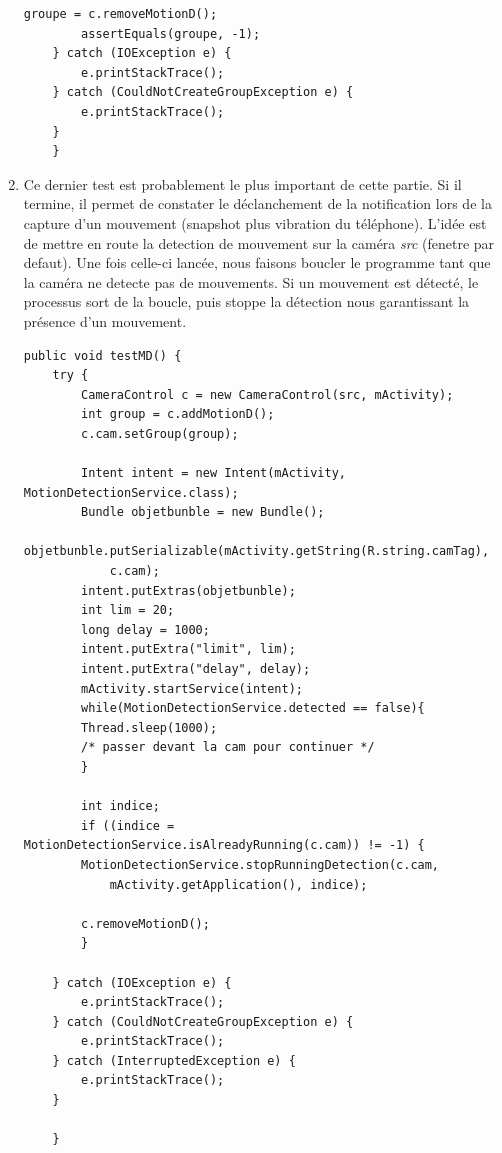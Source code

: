 \begin{enumerate}
\begin{lstlisting}[format=JAVA,caption={Test 6 : Ajout et suppression d'une fenetre}]
	    groupe = c.removeMotionD();
	    assertEquals(groupe, -1);
	} catch (IOException e) {
	    e.printStackTrace();
	} catch (CouldNotCreateGroupException e) {
	    e.printStackTrace();
	}
    }
\end{lstlisting}
\item Ce dernier test est probablement le plus important de cette partie. Si il termine, il permet de constater le déclanchement de la notification lors de la capture d'un mouvement (snapshot plus vibration du téléphone). L'idée est de mettre en route la detection de mouvement sur la caméra \textit{src} (fenetre par defaut). Une fois celle-ci lancée, nous faisons boucler le programme tant que la caméra ne detecte pas de mouvements. Si un mouvement est détecté, le processus sort de la boucle, puis stoppe la détection nous garantissant la présence d'un mouvement.

\begin{lstlisting}[format=JAVA,caption={Test 7 :Détection des mouvements}]
    public void testMD() {
	try {
	    CameraControl c = new CameraControl(src, mActivity);
	    int group = c.addMotionD();
	    c.cam.setGroup(group);
	    
	    Intent intent = new Intent(mActivity, MotionDetectionService.class);
	    Bundle objetbunble = new Bundle();
	    objetbunble.putSerializable(mActivity.getString(R.string.camTag),
		    c.cam);
	    intent.putExtras(objetbunble);
	    int lim = 20;
	    long delay = 1000;
	    intent.putExtra("limit", lim);
	    intent.putExtra("delay", delay);
	    mActivity.startService(intent);
	    while(MotionDetectionService.detected == false){
		Thread.sleep(1000);
		/* passer devant la cam pour continuer */
	    }
	    
	    int indice;
	    if ((indice = MotionDetectionService.isAlreadyRunning(c.cam)) != -1) {
		MotionDetectionService.stopRunningDetection(c.cam,
			mActivity.getApplication(), indice);

		c.removeMotionD();
	    }

	} catch (IOException e) {
	    e.printStackTrace();
	} catch (CouldNotCreateGroupException e) {
	    e.printStackTrace();
	} catch (InterruptedException e) {
	    e.printStackTrace();
	}

    }

\end{lstlisting}
\end{enumerate}


